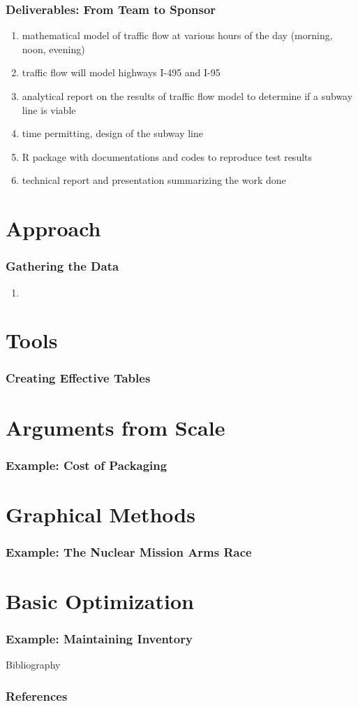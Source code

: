 \documentclass[compress,handout,10pt]{beamer}
\let\olditem\item
\renewcommand{\item}{\setlength{\itemsep}{0.5\baselineskip}\olditem}
\begin{document}
\begin{frame}
    \frametitle{Deliverables: From Team to Sponsor}
    \begin{enumerate}
        \item mathematical model of traffic flow at various hours of the day (morning, noon, evening)
	\item traffic flow will model highways I-495 and I-95
	\item analytical report on the results of traffic flow model to determine if a subway line is viable
	\item time permitting, design of the subway line
	\item R package with documentations and codes to reproduce test results
	\item technical report and presentation summarizing the work done
    \end{enumerate}
\end{frame}

\section{Approach}
\begin{frame}
    \frametitle{Gathering the Data}
     \begin{enumerate}
	\item 
     \end{enumerate}
\end{frame}

\section{Tools}
\begin{frame}
    \frametitle{Creating Effective Tables}
\end{frame}

\section{Arguments from Scale}

\begin{frame}
    \frametitle{Example: Cost of Packaging}
\end{frame}

\section{Graphical Methods}
\begin{frame}
    \frametitle{Example: The Nuclear Mission Arms Race}
\end{frame}

\section{Basic Optimization}
\begin{frame}
    \frametitle{Example: Maintaining Inventory}
\end{frame}

\begin{frame}[allowframebreaks]{Bibliography}
\frametitle{References}

\nocite{*}

\end{frame}
\end{document}

